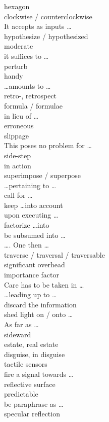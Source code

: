 \documentclass[12pt]{article}
\begin{document}
hexagon \\
clockwise / counterclockwise \\
It accepts as inputs \dots \\
hypothesize / hypothesized \\
moderate \\
it suffices to \dots \\
perturb \\
handy \\
\dots amounts to \dots \\
retro-, retrospect\\
formula / formulae \\
in lieu of \dots \\
erroneous \\
slippage \\
This poses no problem for \dots \\
side-step \\
in action \\
superimpose / superpose \\
\dots pertaining to \dots \\
call for \dots \\
keep \dots into account \\
upon executing \dots \\
factorize \dots into \\
be subsumed into \dots \\
\dots. One then \dots \\
traverse / traversal / traversable \\
significant overhead \\
importance factor \\
Care has to be taken in \dots \\
\dots leading up to \dots \\
discard the information \\
shed light on / onto \dots \\
As far as \dots \\
sideward\\
estate, real estate \\
disguise, in disguise\\
tactile sensors \\
fire a signal towards \dots \\
reflective surface \\
predictable \\
be paraphrase as \dots \\
specular reflection \\
\end{document}
